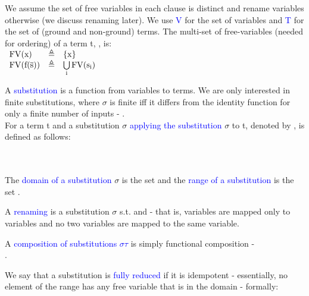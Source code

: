 We assume the set of free variables in each clause is distinct and rename variables otherwise (we discuss renaming later). 
We use \textcolor{blue}{V} for the set of variables and \textcolor{blue}{T} for the set of (ground and non-ground) terms.
The multi-set of free-variables (needed for ordering) of a term t, , is:\\
$ 
\begin{array}{lll}
	\mathrm{FV}(\mathrm{x})         & \triangleq & \left\{\mathrm{x}\right\}\\
	\mathrm{FV}(\mathrm{\mathrm{f}(\mathrm{\overline{s}})}) & \triangleq & \bigcup\limits_{\mathrm{i}} \mathrm{FV}(\mathrm{s_i})\\
\end{array} 
$

\bigskip
\noindent
A \textcolor{blue}{substitution}  is a function from variables to terms. 
We are only interested in finite substitutions, where $\sigma$ is finite iff it differs from the identity function for only a finite number of inputs - .\\
For a term t and a substitution $\sigma$ \textcolor{blue}{applying the substitution} $\sigma$ to t, denoted by , is defined as follows:\\
\\
\\

\bigskip
\noindent
The \textcolor{blue}{domain of a substitution} $\sigma$ is the set   and the \textcolor{blue}{range of a substitution} is the set .


\bigskip
\noindent
A \textcolor{blue}{renaming} is a substitution $\sigma$ s.t.  and  - that is, variables are mapped only to variables and no two variables are mapped to the same variable.

\bigskip
\noindent
A \textcolor{blue}{composition of substitutions $\sigma\tau$} is simply functional composition -\\
 .

\bigskip
\noindent
We say that a substitution is \textcolor{blue}{fully reduced} if it is idempotent - essentially, no element of the range has any free variable that is in the domain - formally:\\

